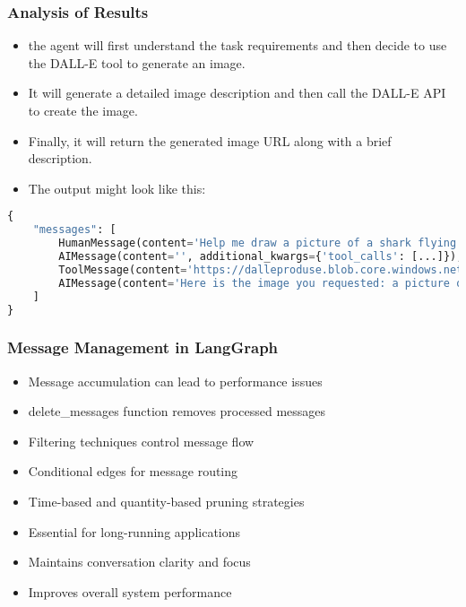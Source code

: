 \begin{frame}[fragile]\frametitle{Analysis of Results}

      \begin{itemize}
        \item the agent will first understand the task requirements and then decide to use the DALL-E tool to generate an image. 
		\item It will generate a detailed image description and then call the DALL-E API to create the image. 
        \item Finally, it will return the generated image URL along with a brief description.
		\item The output might look like this:
      \end{itemize}



      \begin{lstlisting}[language=Python, basicstyle=\tiny]
{
    "messages": [
        HumanMessage(content='Help me draw a picture of a shark flying in the sky'),
        AIMessage(content='', additional_kwargs={'tool_calls': [...]}),
        ToolMessage(content='https://dalleproduse.blob.core.windows.net/...'),
        AIMessage(content='Here is the image you requested: a picture of a shark flying in the sky. You can view the image by clicking the link below.\n\n![Shark flying in the sky](https://dalleproduse.blob.core.windows.net/...)')
    ]
}
      \end{lstlisting}
\end{frame}




\begin{frame}[fragile]\frametitle{Message Management in LangGraph}
      \begin{itemize}
        \item Message accumulation can lead to performance issues
        \item delete\_messages function removes processed messages
        \item Filtering techniques control message flow
        \item Conditional edges for message routing
        \item Time-based and quantity-based pruning strategies
        \item Essential for long-running applications
        \item Maintains conversation clarity and focus
        \item Improves overall system performance
      \end{itemize}
\end{frame}

